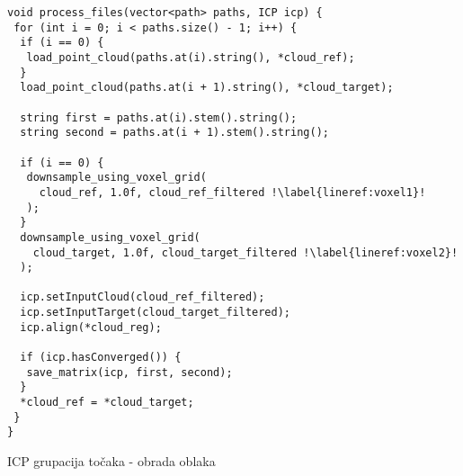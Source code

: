 \begin{listing}[H]
  \begin{verbatim}
void process_files(vector<path> paths, ICP icp) {
 for (int i = 0; i < paths.size() - 1; i++) {
  if (i == 0) {
   load_point_cloud(paths.at(i).string(), *cloud_ref);
  }
  load_point_cloud(paths.at(i + 1).string(), *cloud_target);

  string first = paths.at(i).stem().string(); 
  string second = paths.at(i + 1).stem().string();

  if (i == 0) {
   downsample_using_voxel_grid(
     cloud_ref, 1.0f, cloud_ref_filtered !\label{lineref:voxel1}!
   );
  }
  downsample_using_voxel_grid(
    cloud_target, 1.0f, cloud_target_filtered !\label{lineref:voxel2}!
  );

  icp.setInputCloud(cloud_ref_filtered);
  icp.setInputTarget(cloud_target_filtered);
  icp.align(*cloud_reg);

  if (icp.hasConverged()) {
   save_matrix(icp, first, second);
  }
  *cloud_ref = *cloud_target;
 }
}
  \end{verbatim}
  \caption{ICP grupacija točaka - obrada oblaka}
  \label{coderef:voxel_grouping}
\end{listing}
